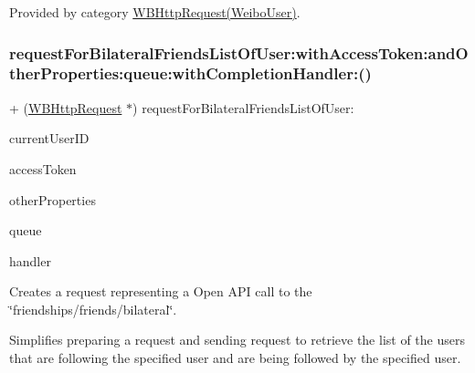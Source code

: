 Provided by category \mbox{\hyperlink{category_w_b_http_request_07_weibo_user_08_a5c4b501746e378232db99ae045e49889}{W\+B\+Http\+Request(\+Weibo\+User)}}.

\mbox{\label{interface_w_b_http_request_a8266e8e1c5230407f29ee63e05e98b38}} 
\subsubsection{\texorpdfstring{request\+For\+Bilateral\+Friends\+List\+Of\+User\+:with\+Access\+Token\+:and\+Other\+Properties\+:queue\+:with\+Completion\+Handler\+:()}{requestForBilateralFriendsListOfUser:withAccessToken:andOtherProperties:queue:withCompletionHandler:()}\hspace{0.1cm}{\footnotesize\ttfamily [1/3]}}
{\footnotesize\ttfamily + (\mbox{\hyperlink{interface_w_b_http_request}{W\+B\+Http\+Request}} $\ast$) request\+For\+Bilateral\+Friends\+List\+Of\+User\+: \begin{DoxyParamCaption}\item[{(N\+S\+String $\ast$)}]{current\+User\+ID }\item[{withAccessToken:(N\+S\+String $\ast$)}]{access\+Token }\item[{andOtherProperties:(N\+S\+Dictionary $\ast$)}]{other\+Properties }\item[{queue:(N\+S\+Operation\+Queue $\ast$)}]{queue }\item[{withCompletionHandler:(W\+B\+Request\+Handler)}]{handler }\end{DoxyParamCaption}}

Creates a request representing a Open A\+PI call to the \char`\"{}friendships/friends/bilateral\char`\"{}.

Simplifies preparing a request and sending request to retrieve the list of the users that are following the specified user and are being followed by the specified user.

